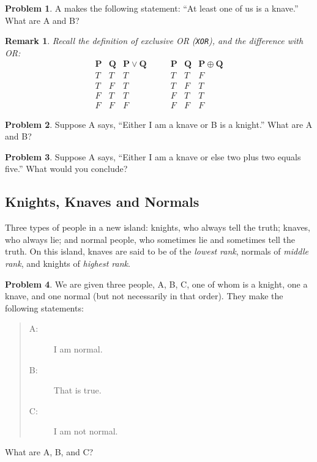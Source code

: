 \documentclass[11pt]{article}
\newtheorem*{remark}{Remark}
\theoremstyle{definition}
\newtheorem{problem}{Problem}
\begin{document}
\begin{problem}
  A makes the following statement: ``At least one of us is a knave.''  What are A and B?
\end{problem}

\begin{remark}
  Recall the definition of \emph{exclusive OR} (\texttt{XOR}), and the difference with \emph{OR}:
  \begin{equation*}
    \begin{array}{c|c|c}
      \boldsymbol{P} & \boldsymbol{Q} & \boldsymbol{P \lor Q} \\ \hline
      T & T & T \\
      T & F & T \\ 
      F & T & T \\ 
      F & F & F
    \end{array}
    \qquad
    \begin{array}{c|c|c}
      \boldsymbol{P} & \boldsymbol{Q} & \boldsymbol{P \oplus Q} \\ \hline
      T & T & F \\
      T & F & T \\ 
      F & T & T \\ 
      F & F & F
    \end{array}
  \end{equation*}
\end{remark}

\begin{problem}
  Suppose A says, ``Either I am a knave or B is a knight.''  What are A and B?
\end{problem}

\begin{problem}
  Suppose A says, ``Either I am a knave or else two plus two equals five.''  What would you conclude?
\end{problem}

\subsection*{Knights, Knaves and Normals}
Three types of people in a new island: knights, who always tell the truth; knaves, who always lie; and normal people,
who sometimes lie and sometimes tell the truth.  On this island, knaves are said to be of the \emph{lowest rank},
normals of \emph{middle rank}, and knights of \emph{highest rank}.

\begin{problem}
  We are given three people, A, B, C, one of whom is a knight, one a knave, and one normal (but not necessarily in that
  order).  They make the following statements:
  \begin{quote}
    \begin{description}
    \item[A:] I am normal.
    \item[B:] That is true.
    \item[C:] I am not normal.
    \end{description}
  \end{quote}
  What are A, B, and C?
\end{problem}
\end{document}
